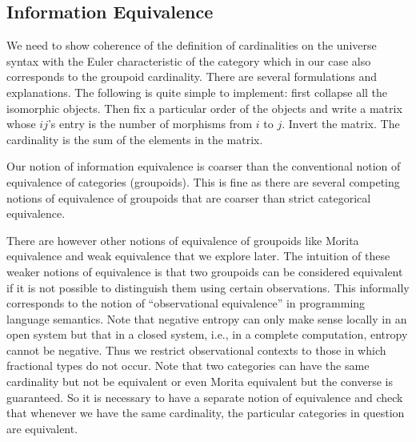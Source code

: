 

\subsection{Information Equivalence}
 
We need to show coherence of the definition of cardinalities on the
universe syntax with the Euler characteristic of the category which in
our case also corresponds to the groupoid cardinality. There are
several formulations and explanations. The following is quite simple
to implement: first collapse all the isomorphic objects. Then fix a
particular order of the objects and write a matrix whose $ij$'s entry
is the number of morphisms from $i$ to $j$. Invert the matrix. The
cardinality is the sum of the elements in the matrix.

Our notion of information equivalence is coarser than the conventional
notion of equivalence of categories (groupoids). This is fine as there
are several competing notions of equivalence of groupoids that are
coarser than strict categorical equivalence. 

There are however other notions of equivalence of groupoids like
Morita equivalence and weak equivalence that we explore later. The
intuition of these weaker notions of equivalence is that two groupoids
can be considered equivalent if it is not possible to distinguish them
using certain observations. This informally corresponds to the notion
of ``observational equivalence'' in programming language
semantics. Note that negative entropy can only make sense locally in
an open system but that in a closed system, i.e., in a complete
computation, entropy cannot be negative. Thus we restrict
observational contexts to those in which fractional types do not
occur. Note that two categories can have the same cardinality but not
be equivalent or even Morita equivalent but the converse is
guaranteed. So it is necessary to have a separate notion of
equivalence and check that whenever we have the same cardinality, the
particular categories in question are equivalent. 

